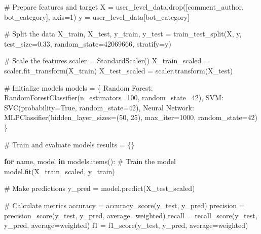 \documentclass[
  12pt,
  letterpaper,
  DIV=11,
  numbers=noendperiod]{scrartcl}
\newenvironment{Shaded}{\begin{snugshade}}{\end{snugshade}}
\newcommand{\CommentTok}[1]{\textcolor[rgb]{0.37,0.37,0.37}{#1}}
\newcommand{\ControlFlowTok}[1]{\textcolor[rgb]{0.00,0.23,0.31}{\textbf{#1}}}
\newcommand{\DecValTok}[1]{\textcolor[rgb]{0.68,0.00,0.00}{#1}}
\newcommand{\FloatTok}[1]{\textcolor[rgb]{0.68,0.00,0.00}{#1}}
\newcommand{\KeywordTok}[1]{\textcolor[rgb]{0.00,0.23,0.31}{\textbf{#1}}}
\newcommand{\NormalTok}[1]{\textcolor[rgb]{0.00,0.23,0.31}{#1}}
\newcommand{\OperatorTok}[1]{\textcolor[rgb]{0.37,0.37,0.37}{#1}}
\newcommand{\StringTok}[1]{\textcolor[rgb]{0.13,0.47,0.30}{#1}}
\newcommand{\VariableTok}[1]{\textcolor[rgb]{0.07,0.07,0.07}{#1}}
\begin{document}
\begin{Shaded}
\begin{Highlighting}[]
\CommentTok{\# Prepare features and target}
\NormalTok{X }\OperatorTok{=}\NormalTok{ user\_level\_data.drop([}\StringTok{\textquotesingle{}comment\_author\textquotesingle{}}\NormalTok{, }\StringTok{\textquotesingle{}bot\_category\textquotesingle{}}\NormalTok{], axis}\OperatorTok{=}\DecValTok{1}\NormalTok{)}
\NormalTok{y }\OperatorTok{=}\NormalTok{ user\_level\_data[}\StringTok{\textquotesingle{}bot\_category\textquotesingle{}}\NormalTok{]}

\CommentTok{\# Split the data}
\NormalTok{X\_train, X\_test, y\_train, y\_test }\OperatorTok{=}\NormalTok{ train\_test\_split(X, y, test\_size}\OperatorTok{=}\FloatTok{0.33}\NormalTok{, random\_state}\OperatorTok{=}\DecValTok{42069666}\NormalTok{, stratify}\OperatorTok{=}\NormalTok{y)}

\CommentTok{\# Scale the features}
\NormalTok{scaler }\OperatorTok{=}\NormalTok{ StandardScaler()}
\NormalTok{X\_train\_scaled }\OperatorTok{=}\NormalTok{ scaler.fit\_transform(X\_train)}
\NormalTok{X\_test\_scaled }\OperatorTok{=}\NormalTok{ scaler.transform(X\_test)}

\CommentTok{\# Initialize models}
\NormalTok{models }\OperatorTok{=}\NormalTok{ \{}
    \StringTok{\textquotesingle{}Random Forest\textquotesingle{}}\NormalTok{: RandomForestClassifier(n\_estimators}\OperatorTok{=}\DecValTok{100}\NormalTok{, random\_state}\OperatorTok{=}\DecValTok{42}\NormalTok{),}
    \StringTok{\textquotesingle{}SVM\textquotesingle{}}\NormalTok{: SVC(probability}\OperatorTok{=}\VariableTok{True}\NormalTok{, random\_state}\OperatorTok{=}\DecValTok{42}\NormalTok{),}
    \StringTok{\textquotesingle{}Neural Network\textquotesingle{}}\NormalTok{: MLPClassifier(hidden\_layer\_sizes}\OperatorTok{=}\NormalTok{(}\DecValTok{50}\NormalTok{, }\DecValTok{25}\NormalTok{), max\_iter}\OperatorTok{=}\DecValTok{1000}\NormalTok{, random\_state}\OperatorTok{=}\DecValTok{42}\NormalTok{)}
\NormalTok{\}}

\CommentTok{\# Train and evaluate models}
\NormalTok{results }\OperatorTok{=}\NormalTok{ \{\}}

\ControlFlowTok{for}\NormalTok{ name, model }\KeywordTok{in}\NormalTok{ models.items():}
    \CommentTok{\# Train the model}
\NormalTok{    model.fit(X\_train\_scaled, y\_train)}
    
    \CommentTok{\# Make predictions}
\NormalTok{    y\_pred }\OperatorTok{=}\NormalTok{ model.predict(X\_test\_scaled)}
    
    \CommentTok{\# Calculate metrics}
\NormalTok{    accuracy }\OperatorTok{=}\NormalTok{ accuracy\_score(y\_test, y\_pred)}
\NormalTok{    precision }\OperatorTok{=}\NormalTok{ precision\_score(y\_test, y\_pred, average}\OperatorTok{=}\StringTok{\textquotesingle{}weighted\textquotesingle{}}\NormalTok{)}
\NormalTok{    recall }\OperatorTok{=}\NormalTok{ recall\_score(y\_test, y\_pred, average}\OperatorTok{=}\StringTok{\textquotesingle{}weighted\textquotesingle{}}\NormalTok{)}
\NormalTok{    f1 }\OperatorTok{=}\NormalTok{ f1\_score(y\_test, y\_pred, average}\OperatorTok{=}\StringTok{\textquotesingle{}weighted\textquotesingle{}}\NormalTok{)}
    

\end{Highlighting}
\end{Shaded}
\end{document}
